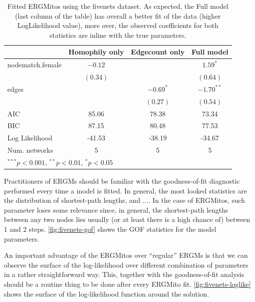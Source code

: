 \documentclass[12pt]{article}
\begin{document}
\begin{table}
\begin{center}
\begin{tabular}{l c c c }
\hline
 & Homophily only & Edgecount only & Full model \\
\hline
nodematch.female & $-0.12$  &             & $1.59^{*}$   \\
                 & $(0.34)$ &             & $(0.64)$     \\
edges            &          & $-0.69^{*}$ & $-1.70^{**}$ \\
                 &          & $(0.27)$    & $(0.54)$     \\
\hline
AIC              & 85.06    & 78.38       & 73.34        \\
BIC              & 87.15    & 80.48       & 77.53        \\
Log Likelihood   & -41.53   & -38.19      & -34.67       \\
Num. networks    & 5        & 5           & 5            \\
\hline
\multicolumn{4}{l}{\scriptsize{$^{***}p<0.001$, $^{**}p<0.01$, $^*p<0.05$}}
\end{tabular}
\caption{Fitted ERGMitos using the fivenets dataset. As expected, the Full model (last column of the table) has overall a better fit of the data (higher LogLikelihood value), more over, the observed coefficients for both statistics are inline with the true parameters.}
\label{fivenets:coefficients}
\end{center}
\end{table}

Practitioners of ERGMs should be familiar with the goodness-of-fit diagnostic performed every time a model is fitted. In general, the most looked statistics are the distribution of shortest-path lengths, and .... In the case of ERGMitos, such parameter loses some relevance since, in general, the shortest-path lengths between any two nodes lies usually (or at least there is a high chance of) between 1 and 2 steps. \autoref{fig:fivenets-gof} shows the GOF statistics for the model parameters.

An important advantage of the ERGMitos over ``regular'' ERGMs is that we can observe the surface of the log-likelihood over different combination of parameters in a rather straightforward way. This, together with the goodness-of-fit analysis should be a routine thing to be done after every ERGMito fit. \autoref{fig:fivenets-loglike} shows the surface of the log-likelihood function around the solution.
\end{document}
